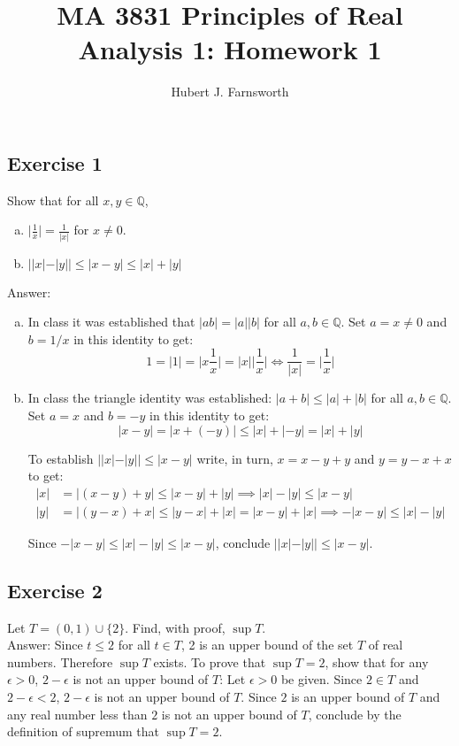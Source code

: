 \documentclass{article}
\title{MA 3831 Principles of Real Analysis 1: Homework 1}
\author{Hubert J. Farnsworth}
\begin{document}
\maketitle


\subsection*{Exercise 1}
Show that for all $x,y \in \mathbb{Q}$,
\begin{enumerate}[a)]
\item
$\big\lvert \frac{1}{x} \big\rvert = \frac{1}{|x|}$ for $x \neq 0$. 

\item
$||x| - |y|| \leq |x-y| \leq |x| + |y|$ \\
\end{enumerate}

Answer:
\begin{enumerate}[a)]
\item
In class it was established that $|ab| = |a||b|$ for all $a,b \in \mathbb{Q}$. Set $a = x \neq 0$ and $b = 1/x$ in this identity to get:
$$
1 = |1| = \biggr\lvert x \frac{1}{x} \biggr\rvert = |x|\biggr\lvert \frac{1}{x} \biggr\rvert \iff \frac{1}{|x|} = \biggr\lvert \frac{1}{x} \biggr\rvert
$$

\item
In class the triangle identity was established: $|a+b| \leq |a| + |b|$ for all $a,b \in \mathbb{Q}$. Set $a = x$ and $b = -y$ in this identity to get: 
$$|x-y| = |x + (-y)| \leq |x| + |-y| = |x|+|y|$$

To establish $||x| - |y|| \leq |x-y|$ write, in turn, $x = x-y + y$ and $y = y-x+x$ to get:
\begin{align*}
|x| &= |(x-y) + y| \leq |x-y| + |y| \implies |x|-|y| \leq |x-y| \\
|y| &= |(y-x) + x| \leq |y-x| + |x| = |x-y| + |x| \implies -|x-y| \leq |x| - |y|
\end{align*}

Since $-|x-y| \leq |x|-|y| \leq |x-y|$, conclude $||x|-|y|| \leq |x-y|$.
\end{enumerate}

\subsection*{Exercise 2}
Let $T = (0,1) \cup \{2\}$. Find, with proof, $\sup T$. \\

Answer: Since $t \leq 2$ for all $t \in T$, 2 is an upper bound of the set $T$ of real numbers. Therefore $\sup T$ exists. To prove that $\sup T = 2$, show that for any $\epsilon > 0$, $2-\epsilon$ is not an upper bound of $T$: Let $\epsilon > 0$ be given. Since $2 \in T$ and $2-\epsilon < 2$, $2-\epsilon$ is not an upper bound of $T$. Since $2$ is an upper bound of $T$ and any real number less than $2$ is not an upper bound of $T$, conclude by the definition of supremum that $\sup T = 2$. 
\end{document}
